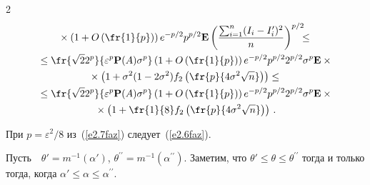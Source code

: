 \begin{multicols}{2}
\begin{multline}
{}\times \left(1+O\left(\fr{1}{p}\right)\right)e^{-p/2}


p^{p/2}{\E}\left(\frac{\sum_{i=1}^n


(I_i-I'_i)^2}{n}\right)^{p/2}\!\!\!\le{}\\


{}


\le\fr{\sqrt{2}2^p}{\varepsilon^p\P(A)\sigma^p


}\left(1+O\left(\fr{1}{p}\right)\right)e^{-{p}/{2}} p^{


{p}/{2}} 2^{{p}/{2}}\sigma^p{\E}\times{}\\


{}\times


\left(1+\sigma^2(1-2\sigma^2)


f_2\left(\fr{p}{4\sigma^2\sqrt {n}}\right)\right)\le{}\\


{}


\le\fr{\sqrt{2}2^p}{\varepsilon^p\P(A)\sigma^p


}\left(1+O\left(\fr{1}{p}\right)\right)e^{-{p}/{2}} 


p^{{p}/{2}}2^{{p}/{2}}\sigma^p{\E}\times{}\\


{}\times


\left(1+\fr{1}{8}


f_2\left(\fr{p}{4\sigma^2\sqrt {n}}\right)\right)\,. 


\label{e2.7faz}


\end{multline}





При $p={\varepsilon^2}/{8}$ из~(\ref{e2.7faz}) следует~(\ref{e2.6faz}).





 Пусть\ \, $ \theta'=m^{-1}( \alpha')$, $


\theta^{\prime\prime}=m^{-1}( \alpha^{\prime\prime})$. Заметим, что $ \theta'\le \theta


\le \theta^{\prime\prime}$ тогда и только тогда, когда $ \alpha'\le \alpha\le


\alpha^{\prime\prime}$.








\medskip





\noindent



\end{multicols}
